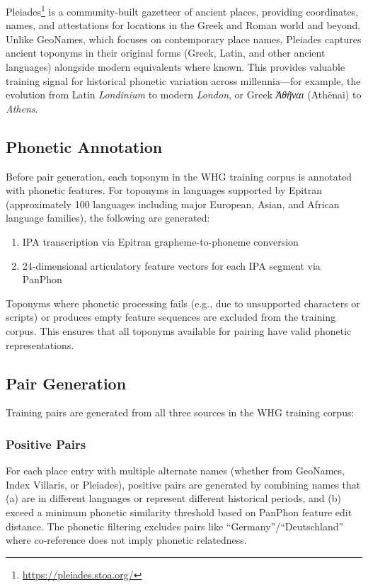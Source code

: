 \documentclass[11pt]{article}
\begin{document}
    Pleiades\footnote{\url{https://pleiades.stoa.org/}} is a community-built gazetteer of ancient places, providing coordinates, names, and attestations for locations in the Greek and Roman world and beyond. Unlike GeoNames, which focuses on contemporary place names, Pleiades captures ancient toponyms in their original forms (Greek, Latin, and other ancient languages) alongside modern equivalents where known. This provides valuable training signal for historical phonetic variation across millennia---for example, the evolution from Latin \emph{Londinium} to modern \emph{London}, or Greek \emph{Ἀθῆναι} (Athēnai) to \emph{Athens}.

    \subsection{Phonetic Annotation}

    Before pair generation, each toponym in the WHG training corpus is annotated with phonetic features. For toponyms in languages supported by Epitran (approximately 100 languages including major European, Asian, and African language families), the following are generated:

    \begin{enumerate}
        \item IPA transcription via Epitran grapheme-to-phoneme conversion
        \item 24-dimensional articulatory feature vectors for each IPA segment via PanPhon
    \end{enumerate}

    Toponyms where phonetic processing fails (e.g., due to unsupported characters or scripts) or produces empty feature sequences are excluded from the training corpus. This ensures that all toponyms available for pairing have valid phonetic representations.

    \subsection{Pair Generation}

    Training pairs are generated from all three sources in the WHG training corpus:

    \subsubsection{Positive Pairs}

    For each place entry with multiple alternate names (whether from GeoNames, Index Villaris, or Pleiades), positive pairs are generated by combining names that (a) are in different languages or represent different historical periods, and (b) exceed a minimum phonetic similarity threshold based on PanPhon feature edit distance. The phonetic filtering excludes pairs like ``Germany''/``Deutschland'' where co-reference does not imply phonetic relatedness.
\end{document}
